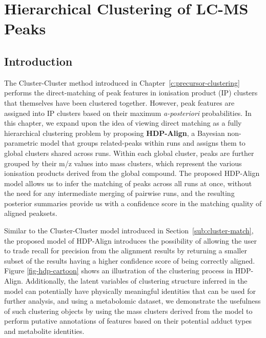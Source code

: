 \chapter{Hierarchical Clustering of LC-MS Peaks}
\label{c:hdp}

\section{Introduction}

The Cluster-Cluster method introduced in Chapter~\ref{c:precursor-clustering} performs the direct-matching of peak features in ionisation product (IP) clusters that themselves have been clustered together. However, peak features are assigned into IP clusters based on their maximum \textit{a-posteriori} probabilities. In this chapter, we expand upon the idea of viewing direct matching as a fully hierarchical clustering problem by proposing \textbf{HDP-Align}, a Bayesian non-parametric model that groups related-peaks within runs and assigns them to global clusters shared across runs. Within each global cluster, peaks are further grouped by their m/z values into mass clusters, which represent the various ionisation products derived from the global compound. The proposed HDP-Align model allows us to infer the matching of peaks across all runs at once, without the need for any intermediate merging of pairwise runs, and the resulting posterior summaries provide us with a confidence score in the matching quality of aligned peaksets. 

Similar to the Cluster-Cluster model introduced in Section~\ref{sub:cluster-match}, the proposed model of HDP-Align introduces the possibility of allowing the user to trade recall for precision from the alignment results by returning a smaller subset of the results having a higher confidence score of being correctly aligned. Figure \ref{fig-hdp-cartoon} shows an illustration of the clustering process in HDP-Align. Additionally, the latent variables of clustering structure inferred in the model can potentially have physically meaningful identities that can be used for further analysis, and using a metabolomic dataset, we demonstrate the usefulness of such clustering objects by using the mass clusters derived from the model to perform putative annotations of features based on their potential adduct types and metabolite identities.

